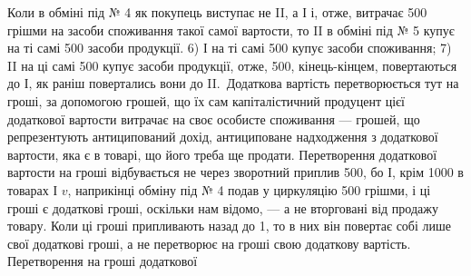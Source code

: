 Коли в обміні під № 4 як покупець виступає не II, а І і, отже, витрачає
500 грішми на засоби споживання такої самої вартости, то II
в обміні під № 5 купує на ті самі 500 засоби продукції.
6) І на ті самі 500 купує засоби споживання; 7) II на ці самі
500 купує засоби продукції, отже, 500, кінець-кінцем,
повертаються до І, як раніш повертались вони до II.~Додаткова вартість
перетворюється тут на гроші, за допомогою грошей, що їх сам капіталістичний
продуцент цієї додаткової вартости витрачає на своє особисте
споживання — грошей, що репрезентують антиципований дохід, антициповане
надходження з додаткової вартости, яка є в товарі, що його треба
ще продати. Перетворення додаткової вартости на гроші відбувається не
через зворотний приплив 500, бо І, крім 1000
в товарах І $v$, наприкінці обміну під № 4 подав у циркуляцію 500 грішми, і ці гроші є додаткові гроші, оскільки нам відомо, — а не
вторговані від продажу товару. Коли ці гроші припливають назад до 1,
то в них він повертає собі лише свої додаткові гроші, а не перетворює
на гроші свою додаткову вартість. Перетворення на гроші додаткової
\parbreak{}  %

